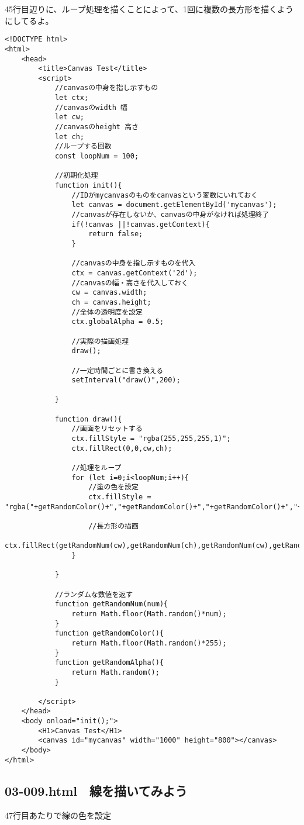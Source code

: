 \documentclass[mingoth,11pt,a4j,uplatex]{jsarticle}
\begin{document}
45行目辺りに、ループ処理を描くことによって、1回に複数の長方形を描くようにしてるよ。
\begin{lstlisting}[caption=　複数の長方形を描いてアニメーションする]
<!DOCTYPE html>
<html>
	<head>
		<title>Canvas Test</title>
		<script>
			//canvasの中身を指し示すもの
			let ctx;
			//canvasのwidth 幅
			let cw;
			//canvasのheight 高さ
			let ch;
			//ループする回数
			const loopNum = 100;	
			
			//初期化処理
			function init(){
				//IDがmycanvasのものをcanvasという変数にいれておく
				let canvas = document.getElementById('mycanvas');
				//canvasが存在しないか、canvasの中身がなければ処理終了
				if(!canvas ||!canvas.getContext){
					return false;
				}
				
				//canvasの中身を指し示すものを代入
				ctx = canvas.getContext('2d');
				//canvasの幅・高さを代入しておく
				cw = canvas.width;
				ch = canvas.height;
				//全体の透明度を設定
				ctx.globalAlpha = 0.5;
				
				//実際の描画処理
				draw();
				
				//一定時間ごとに書き換える
				setInterval("draw()",200);

			}
			
			function draw(){
				//画面をリセットする
				ctx.fillStyle = "rgba(255,255,255,1)";
				ctx.fillRect(0,0,cw,ch);
				
				//処理をループ
				for (let i=0;i<loopNum;i++){
					//塗の色を設定
					ctx.fillStyle = "rgba("+getRandomColor()+","+getRandomColor()+","+getRandomColor()+","+getRandomAlpha()+")";
					
					//長方形の描画
					ctx.fillRect(getRandomNum(cw),getRandomNum(ch),getRandomNum(cw),getRandomNum(ch));
				}

			}
			
			//ランダムな数値を返す
			function getRandomNum(num){
				return Math.floor(Math.random()*num);
			}
			function getRandomColor(){
				return Math.floor(Math.random()*255);
			}
			function getRandomAlpha(){
				return Math.random();
			}

		</script>
	</head>
	<body onload="init();">
		<H1>Canvas Test</H1>
		<canvas id="mycanvas" width="1000" height="800"></canvas>
	</body>
</html>
\end{lstlisting}

\subsection{03-009.html　線を描いてみよう}
47行目あたりで線の色を設定
\end{document}
